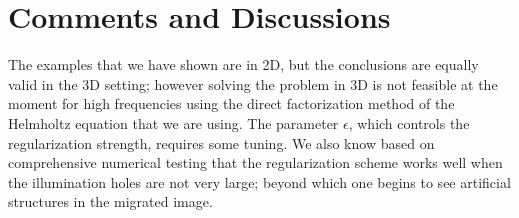 \section{Comments and Discussions}
\vspace*{-0.2cm}
The examples that we have shown are in 2D, but the conclusions are equally valid in the 3D setting; however solving the problem in 3D is not feasible at the moment for high frequencies using the direct factorization method of the Helmholtz equation that we are using. The parameter $\epsilon$, which controls the regularization strength, requires some tuning. We also know based on comprehensive numerical testing that the regularization scheme works well when the illumination holes are not very large; beyond which one begins to see artificial structures in the migrated image.